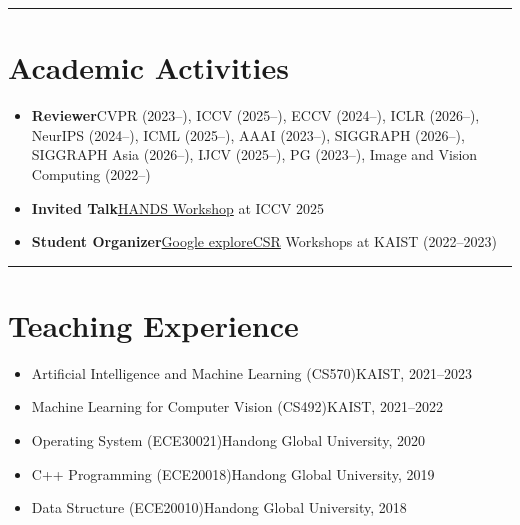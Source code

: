 \documentclass[10.5pt,a4paper]{article}
\newcommand{\sep}{{\color{gray}\;\textbullet\;\;}}
\newcommand{\hsep}{\noindent\textcolor{gray!40}{\rule{\textwidth}{0.5pt}}\vspace{4pt}}
\begin{document}
\hsep
\section{Academic Activities}

\begin{itemize}[itemsep=3pt]
  \item \textbf{Reviewer}\sep CVPR (2023--), ICCV (2025--), ECCV (2024--), ICLR (2026--), NeurIPS (2024--), ICML (2025--), AAAI (2023--), SIGGRAPH (2026--), SIGGRAPH Asia (2026--), IJCV (2025--), PG (2023--), Image and Vision Computing (2022--)
  \item \textbf{Invited Talk}\sep \href{https://hands-workshop.org/workshop2025.html}{HANDS Workshop} at ICCV 2025
  \item \textbf{Student Organizer}\sep \href{https://research.google/outreach/explore-csr/}{Google exploreCSR} Workshops at KAIST (2022--2023)
\end{itemize}

\hsep
\section{Teaching Experience}

\begin{itemize}[itemsep=2pt]
  \item Artificial Intelligence and Machine Learning (CS570)\sep KAIST, 2021--2023
  \item Machine Learning for Computer Vision (CS492)\sep KAIST, 2021--2022
  \item Operating System (ECE30021)\sep Handong Global University, 2020
  \item C++ Programming (ECE20018)\sep Handong Global University, 2019
  \item Data Structure (ECE20010)\sep Handong Global University, 2018
\end{itemize}
\end{document}
